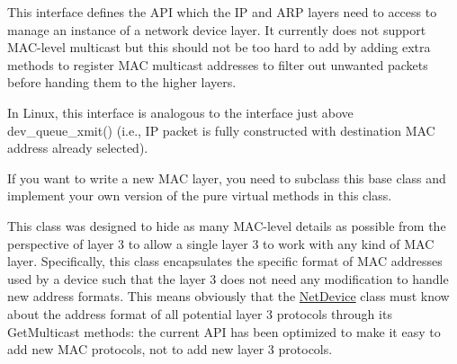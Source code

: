 This interface defines the A\+PI which the IP and A\+RP layers need to access to manage an instance of a network device layer. It currently does not support M\+A\+C-\/level multicast but this should not be too hard to add by adding extra methods to register M\+AC multicast addresses to filter out unwanted packets before handing them to the higher layers.

In Linux, this interface is analogous to the interface just above dev\+\_\+queue\+\_\+xmit() (i.\+e., IP packet is fully constructed with destination M\+AC address already selected).

If you want to write a new M\+AC layer, you need to subclass this base class and implement your own version of the pure virtual methods in this class.

This class was designed to hide as many M\+A\+C-\/level details as possible from the perspective of layer 3 to allow a single layer 3 to work with any kind of M\+AC layer. Specifically, this class encapsulates the specific format of M\+AC addresses used by a device such that the layer 3 does not need any modification to handle new address formats. This means obviously that the \hyperlink{classns3_1_1NetDevice}{Net\+Device} class must know about the address format of all potential layer 3 protocols through its Get\+Multicast methods\+: the current A\+PI has been optimized to make it easy to add new M\+AC protocols, not to add new layer 3 protocols.

